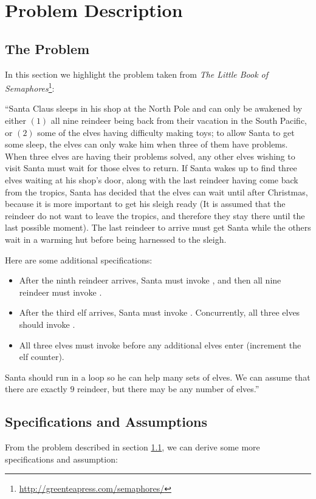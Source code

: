 \section{Problem Description}
\label{sec:problem}

\subsection{The Problem}
\label{subsec:problem}
In this section we highlight the problem taken from
\textit{The Little Book of Semaphores}\footnote{\url{http://greenteapress.com/semaphores/}}:

``Santa Claus sleeps in his shop at the North Pole and can only be awakened by
either $(1)$ all nine reindeer being back from their vacation in the South
Pacific, or $(2)$ some of the elves having difficulty making toys; to allow Santa
to get some sleep, the elves can only wake him when three of them have
problems. When three elves are having their problems solved, any other elves
wishing to visit Santa must wait for those elves to return. If Santa wakes up
to find three elves waiting at his shop’s door, along with the last reindeer
having come back from the tropics, Santa has decided that the elves can wait
until after Christmas, because it is more important to get his sleigh ready
(It is assumed that the reindeer do not want to leave the tropics, and
therefore they stay there until the last possible moment). The last reindeer
to arrive must get Santa while the others wait in a warming hut before being
harnessed to the sleigh.

Here are some additional specifications:

\begin{itemize}
\item After the ninth reindeer arrives, Santa must invoke , and
then all nine reindeer must invoke .
\item After the third elf arrives, Santa must invoke . Concurrently,
all three elves should invoke .
\item All three elves must invoke  before any additional elves enter
(increment the elf counter).
\end{itemize}

Santa should run in a loop so he can help many sets of elves. We can assume
that there are exactly $9$ reindeer, but there may be any number of elves.''

\subsection{Specifications and Assumptions}
\label{subsec:specifications}
From the problem described in section \ref{subsec:problem}, we can derive some
more specifications and assumption:

